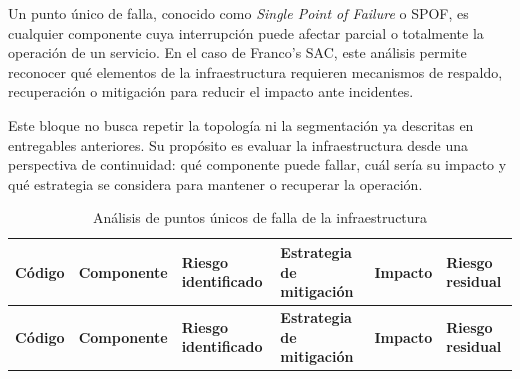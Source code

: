 \documentclass[11pt, a4paper, oneside]{report}
\begin{document}
Un punto único de falla, conocido como \textit{Single Point of Failure} o SPOF, es cualquier componente cuya interrupción puede afectar parcial o totalmente la operación de un servicio. En el caso de Franco's SAC, este análisis permite reconocer qué elementos de la infraestructura requieren mecanismos de respaldo, recuperación o mitigación para reducir el impacto ante incidentes.

Este bloque no busca repetir la topología ni la segmentación ya descritas en entregables anteriores. Su propósito es evaluar la infraestructura desde una perspectiva de continuidad: qué componente puede fallar, cuál sería su impacto y qué estrategia se considera para mantener o recuperar la operación.

\begin{landscape}
\thispagestyle{fancy}

\renewcommand{\arraystretch}{1.3}
\footnotesize
{}

\begin{xltabular}{\linewidth}{@{}|L{2.2cm}|L{3.4cm}|L{3.6cm}|L{5.5cm}|L{2.4cm}|X|@{}}
\caption{Análisis de puntos únicos de falla de la infraestructura}
\label{tab:analisis_spof_infraestructura} \\

\parbox[c][1.1cm][c]{\linewidth}{\centering\color{white}\bfseries\small Código} &
\parbox[c][1.1cm][c]{\linewidth}{\centering\color{white}\bfseries\small Componente} &
\parbox[c][1.1cm][c]{\linewidth}{\centering\color{white}\bfseries\small Riesgo identificado} &
\parbox[c][1.1cm][c]{\linewidth}{\centering\color{white}\bfseries\small Estrategia de mitigación} &
\parbox[c][1.1cm][c]{\linewidth}{\centering\color{white}\bfseries\small Impacto} &
\parbox[c][1.1cm][c]{\linewidth}{\centering\color{white}\bfseries\small Riesgo residual} \\ \hline
\endfirsthead

\parbox[c][1.1cm][c]{\linewidth}{\centering\color{white}\bfseries\small Código} &
\parbox[c][1.1cm][c]{\linewidth}{\centering\color{white}\bfseries\small Componente} &
\parbox[c][1.1cm][c]{\linewidth}{\centering\color{white}\bfseries\small Riesgo identificado} &
\parbox[c][1.1cm][c]{\linewidth}{\centering\color{white}\bfseries\small Estrategia de mitigación} &
\parbox[c][1.1cm][c]{\linewidth}{\centering\color{white}\bfseries\small Impacto} &
\parbox[c][1.1cm][c]{\linewidth}{\centering\color{white}\bfseries\small Riesgo residual} \\ \hline
\endhead


\end{xltabular}
\end{landscape}
\end{document}
